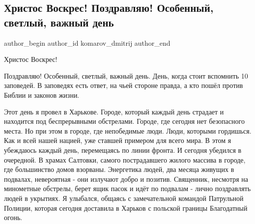  
 
 
 
 
 
\subsection{Христос Воскрес! Поздравляю! Особенный, светлый, важный день}
\label{sec:24_04_2022.fb.komarov_dmitrij.1.hristos_voskres}
 
\ifcmt
 author_begin
   author_id komarov_dmitrij
 author_end
\fi

Христос Воскрес!

Поздравляю! Особенный, светлый, важный день. День, когда стоит вспомнить 10
заповедей. В заповедях есть ответ, на чьей стороне правда, а кто пошёл против
Библии и законов жизни.


Этот день я провел в Харькове. Городе, который каждый день страдает и находится
под беспрерывными обстрелами. Городе, где сегодня нет безопасного места. Но при
этом в городе, где непобедимые люди. Люди, которыми гордишься. Как и всей нашей
нацией, уже ставшей примером для всего мира. В этом я убеждаюсь каждый день,
перемещаясь по линии фронта. И сегодня убедился в очередной. В храмах Салтовки,
самого пострадавшего жилого массива в городе, где большинство домов взорваны.
Энергетика людей, два месяца живущих в подвалах, невероятная - они излучают
добро и позитив.  Священник, несмотря на минометные обстрелы, берет ящик пасок
и идёт по подвалам - лично поздравлять людей в укрытиях. Я улыбался, общаясь с
замечательной командой Патрульной Полиции, которая сегодня доставила в Харьков
с польской границы Благодатный огонь.



